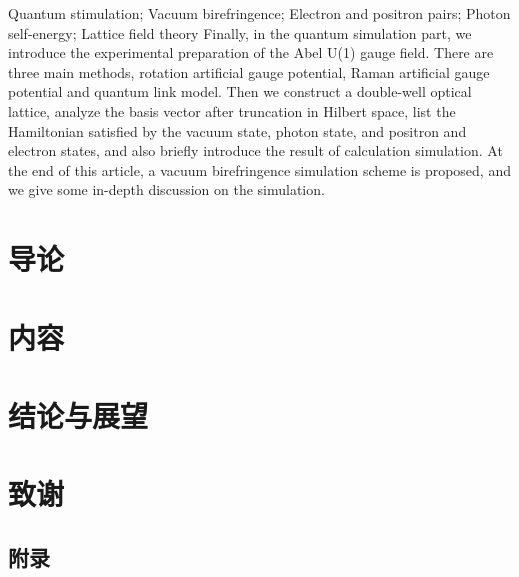 \documentclass[supercite]{HustGraduPaper}
\begin{document}
\begin{enabstract}{Quantum stimulation; Vacuum birefringence; Electron and positron pairs; Photon self-energy; Lattice field theory}
		Finally, in the quantum simulation part, we introduce the experimental preparation of the Abel U(1) gauge field. There are three main methods, rotation artificial gauge potential, Raman artificial gauge potential and quantum link model. Then we construct a double-well optical lattice, analyze the basis vector after truncation in Hilbert space, list the Hamiltonian satisfied by the vacuum state, photon state, and positron and electron states, and also briefly introduce the result of calculation simulation. At the end of this article, a vacuum birefringence simulation scheme is proposed, and we give some in-depth discussion on the simulation. 
	\end{enabstract}
	
	\tableofcontents
	\clearpage%
	
	\section{导论}
	\section{内容}
	\section{结论与展望}
	\section{致谢}

	
    \begin{appendices}
    	\section{附录}
    	
    \end{appendices}
\end{document}
